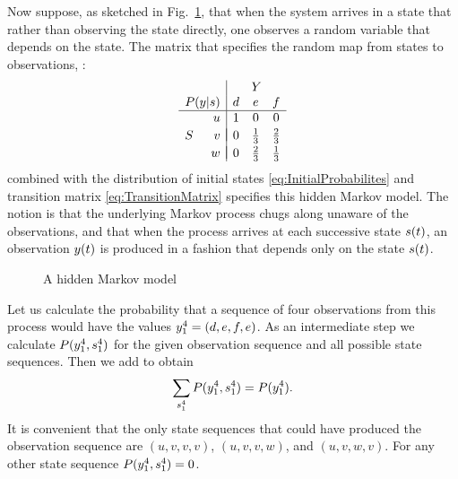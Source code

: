 %
Now suppose, as sketched in Fig.~\ref{fig:dhmm}, that when the system
arrives in a state that rather than observing the state directly, one
observes a random variable that depends on the state.  The matrix that
specifies the random map from states to observations, \ie%
:
\begin{equation*}
  \begin{array}{cr|ccc}
      &      &\multicolumn{3}{c}{Y} \\
      \multicolumn{2}{r|}{P(y|s)} & d & e           & f \\ %
      \hline%
      & u      & 1 & 0           & 0 \\
      &        & \vspace{-1 em} \\
    S & v      & 0 & \frac{1}{3} & \frac{2}{3} \\
      &        & \vspace{-1 em} \\
      & w      & 0 & \frac{2}{3} & \frac{1}{3}
  \end{array}%
\end{equation*}
combined with the distribution of initial states
\eqref{eq:InitialProbabilites} and transition matrix
\eqref{eq:TransitionMatrix} specifies this hidden Markov model.  The
notion is that the underlying Markov process chugs along unaware of
the observations, and that when the process arrives at each successive
state ${s}{(t)}$, an observation ${y}{(t)}$ is produced in a fashion
that depends only on the state ${s}{(t)}$.

\begin{figure}[htbp]
  \centering{\plotsize%
    }
  \caption[A hidden Markov model.]{A hidden Markov model}
  \label{fig:dhmm}
\end{figure}

Let us calculate the probability that a sequence of four observations
from this process would have the values $y_{1}^{4} = (d,e,f,e)$.
As an intermediate step we calculate $P(y_{1}^{4},s_{1}^{4})$
for the given observation sequence and all possible state sequences.
Then we add to obtain
\begin{equation}
  \label{eq:dhmm_sum}
  \sum_{s_{1}^{4}} P(y_{1}^{4},s_{1}^{4}) = P(y_{1}^{4}).
\end{equation}
It is convenient that the only state sequences that could have
produced the observation sequence are $(u,v,v,v)$, $(u,v,v,w)$, and
$(u,v,w,v)$.  For any other state sequence
$P(y_{1}^{4},s_{1}^{4}) = 0$.

